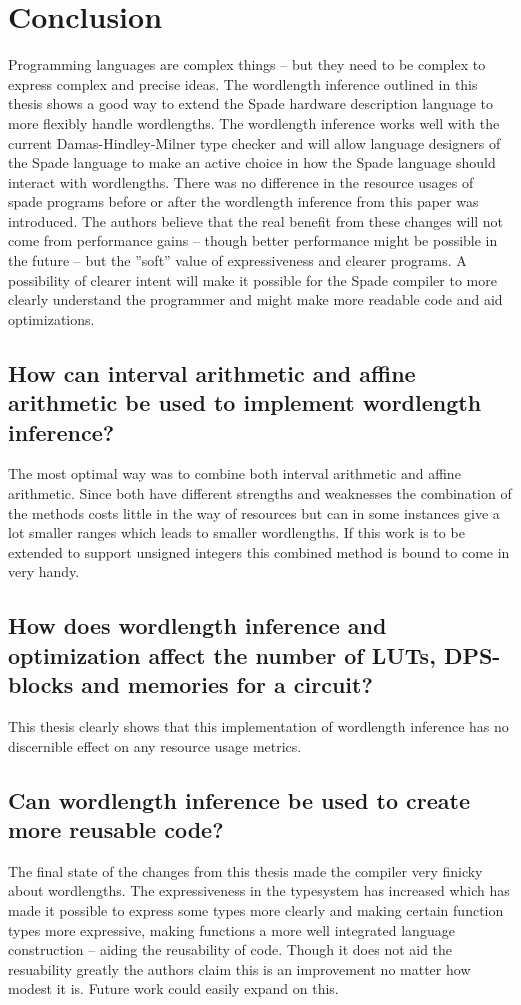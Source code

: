 \chapter{Conclusion}
\label{cha:Conclusion}
Programming languages are complex things -- but they need to be complex to express complex and precise ideas. The wordlength inference outlined in this thesis shows a good way to extend the Spade hardware description language to more flexibly handle wordlengths. The wordlength inference works well with the current Damas-Hindley-Milner type checker and will allow language designers of the Spade language to make an active choice in how the Spade language should interact with wordlengths. There was no difference in the resource usages of spade programs before or after the wordlength inference from this paper was introduced. The authors believe that the real benefit from these changes will not come from performance gains -- though better performance might be possible in the future -- but the ''soft'' value of expressiveness and clearer programs. A possibility of clearer intent will make it possible for the Spade compiler to more clearly understand the programmer and might make more readable code and aid optimizations.


\section{How can interval arithmetic and affine arithmetic be used to implement wordlength inference?}
The most optimal way was to combine both interval arithmetic and affine arithmetic. Since both have different strengths and weaknesses the combination of the methods costs little in the way of resources but can in some instances give a lot smaller ranges which leads to smaller wordlengths. If this work is to be extended to support unsigned integers this combined method is bound to come in very handy. 

\section{How does wordlength inference and optimization affect the number of LUTs, DPS-blocks and memories for a circuit?}
This thesis clearly shows that this implementation of wordlength inference has no discernible effect on any resource usage metrics.

\section{Can wordlength inference be used to create more reusable code?}
The final state of the changes from this thesis made the compiler very finicky about wordlengths. The expressiveness in the typesystem has increased which has made it possible to express some types more clearly and making certain function types more expressive, making functions a more well integrated language construction -- aiding the reusability of code. Though it does not aid the resuability greatly the authors claim this is an improvement no matter how modest it is. Future work could easily expand on this.


